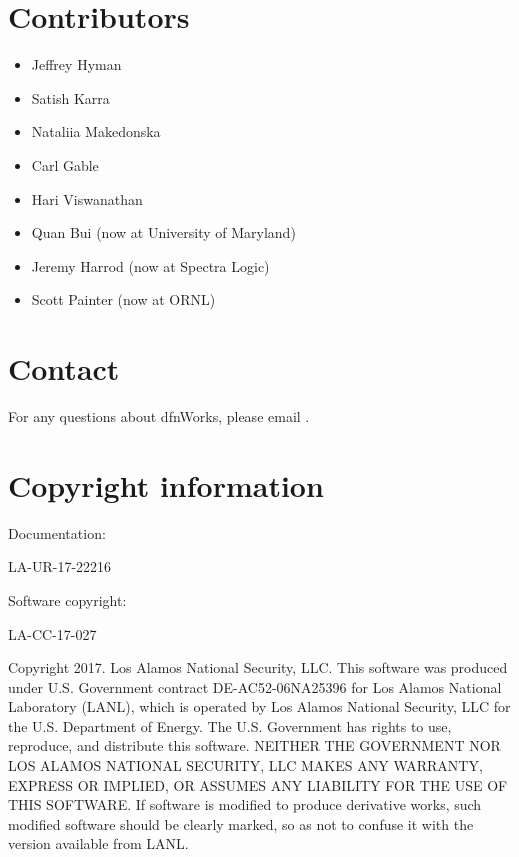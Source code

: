 \documentclass[letterpaper,10pt,english]{sphinxmanual}
\begin{document}
\section{Contributors}
\label{\detokenize{intro:contributors}}\begin{itemize}
\item {} 
Jeffrey Hyman

\item {} 
Satish Karra

\item {} 
Nataliia Makedonska

\item {} 
Carl Gable

\item {} 
Hari Viswanathan

\item {} 
Quan Bui (now at University of Maryland)

\item {} 
Jeremy Harrod (now at Spectra Logic)

\item {} 
Scott Painter (now at ORNL)

\end{itemize}


\section{Contact}
\label{\detokenize{intro:contact}}
For any questions about dfnWorks, please email .


\section{Copyright information}
\label{\detokenize{intro:copyright-information}}
Documentation:

LA-UR-17-22216

Software copyright:

LA-CC-17-027

Copyright 2017. Los Alamos National Security, LLC. This software was produced under U.S. Government contract DE-AC52-06NA25396 for Los Alamos National Laboratory (LANL), which is operated by Los Alamos National Security, LLC for the U.S. Department of Energy. The U.S. Government has rights to use, reproduce, and distribute this software.  NEITHER THE GOVERNMENT NOR LOS ALAMOS NATIONAL SECURITY, LLC MAKES ANY WARRANTY, EXPRESS OR IMPLIED, OR ASSUMES ANY LIABILITY FOR THE USE OF THIS SOFTWARE.  If software is modified to produce derivative works, such modified software should be clearly marked, so as not to confuse it with the version available from LANL.
\end{document}
